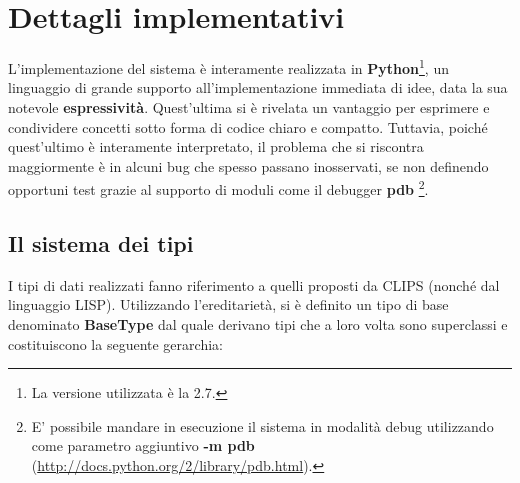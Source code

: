 
\chapter{Dettagli implementativi}
L'implementazione del sistema è interamente realizzata in \textbf{Python}\footnote{La versione utilizzata è la  2.7.}, un linguaggio di grande supporto all'implementazione immediata di idee, data la sua notevole \textbf{espressività}. Quest'ultima si è rivelata un vantaggio per esprimere e condividere concetti sotto forma di codice chiaro e compatto. Tuttavia, poiché quest'ultimo è interamente interpretato, il problema che si riscontra maggiormente è in alcuni bug che spesso passano inosservati, se non definendo opportuni test grazie al supporto di moduli come il debugger \textbf{pdb} \footnote{E' possibile mandare in esecuzione il sistema in modalità debug utilizzando come parametro aggiuntivo \textbf{-m pdb} (\url{http://docs.python.org/2/library/pdb.html}).}.

\section{Il sistema dei tipi}

I tipi di dati realizzati fanno riferimento a quelli proposti da CLIPS (nonché dal linguaggio LISP). Utilizzando l'ereditarietà, si è definito un tipo di base denominato \textbf{BaseType} dal quale derivano tipi che a loro volta sono superclassi e costituiscono la seguente gerarchia:

